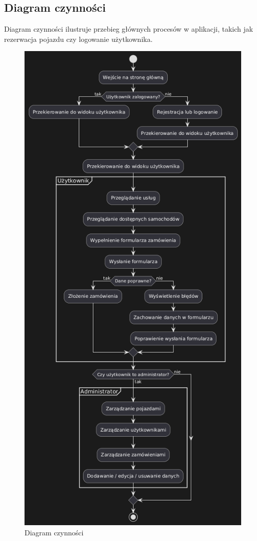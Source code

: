 \documentclass[12pt]{article}
\begin{document}
\subsection{Diagram czynności}
	Diagram czynności ilustruje przebieg głównych procesów w aplikacji, takich jak rezerwacja pojazdu czy logowanie użytkownika.
	\begin{figure}[H]
		\centering
		\includegraphics[height=0.78\textheight]{diagramCzynnosci}
		\caption{Diagram czynności}
		\label{fig:diagramCzynnosci}
	\end{figure}
	
\end{document}
